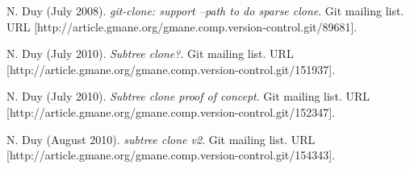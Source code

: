 \documentclass[preprint]{sigplanconf}
\begin{document}
\begin{thebibliography}{10}
    N. Duy (July 2008).
    \newblock \emph{git-clone: support --path to do sparse clone}.
    \newblock Git mailing list.
    \newblock URL
    [http://article.gmane.org/gmane.comp.version-control.git/89681].

    N. Duy (July 2010).
    \newblock \emph{Subtree clone?}.
    \newblock Git mailing list.
    \newblock URL
    [http://article.gmane.org/gmane.comp.version-control.git/151937].

    N. Duy (July 2010).
    \newblock \emph{Subtree clone proof of concept}.
    \newblock Git mailing list.
    \newblock URL
    [http://article.gmane.org/gmane.comp.version-control.git/152347].

    N. Duy (August 2010).
    \newblock \emph{subtree clone v2}.
    \newblock Git mailing list.
    \newblock URL
    [http://article.gmane.org/gmane.comp.version-control.git/154343].

\end{thebibliography}
\end{document}
